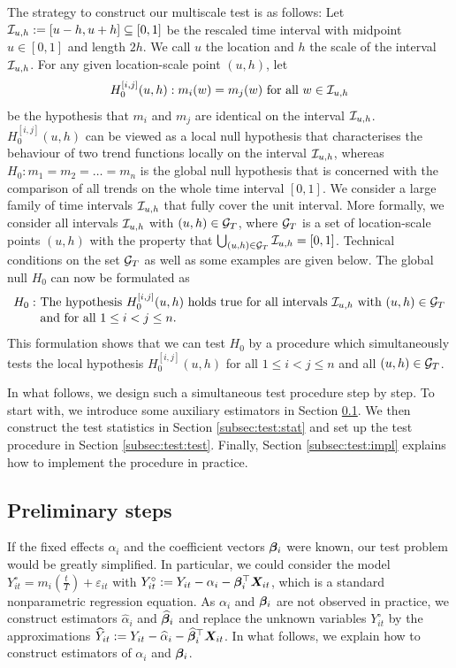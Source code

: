 \documentclass[12pt]{article}
\begin{document}
The strategy to construct our multiscale test is as follows: Let $\mathcal{I}_{u, h} := [u-h, u+h] \subseteq [0,1]$ be the rescaled time interval with midpoint $u \in [0,1]$ and length $2h$. We call $u$ the location
and $h$ the scale of the interval $\mathcal{I}_{u, h}$. For any given location-scale point $(u,h)$, let
\[ H_0^{[i, j]}(u, h): m_i(w) = m_j(w) \text{ for all } w \in \mathcal{I}_{u, h} \] 
be the hypothesis that $m_i$ and $m_j$ are identical on the interval $\mathcal{I}_{u, h}$. $H_0^{[i, j]}(u, h)$ can be viewed as a local null hypothesis that characterises the behaviour of two trend functions locally on the interval $\mathcal{I}_{u, h}$, whereas $H_0: m_1 = m_2 = \ldots = m_n$ is the global null hypothesis that is concerned with the comparison of all trends on the whole time interval $[0, 1]$. We consider a large family of time intervals $\mathcal{I}_{u, h}$ that fully cover the unit interval. More formally, we consider all intervals $\mathcal{I}_{u, h}$ with $(u,h) \in \mathcal{G}_T$, where $\mathcal{G}_T$ is a set of location-scale points $(u,h)$ with the property that $\bigcup_{(u, h) \in \mathcal{G}_T} \mathcal{I}_{u, h} = [0,1]$. Technical conditions on the set $\mathcal{G}_T$ as well as some examples are given below. The global null $H_0$ can now be formulated as 
\begin{align*}
H_0: \ & \text{The hypothesis } H_0^{[i, j]}(u, h) \text{ holds true for all intervals }  \mathcal{I}_{u, h} \text{ with } (u, h) \in \mathcal{G}_T \\[-0.075cm] & \text{and for all } 1 \le i < j \le n. 
\end{align*} 
This formulation shows that we can test $H_0$ by a procedure which simultaneously tests the local hypothesis $H_0^{[i, j]}(u, h)$ for all $1 \le i < j \le n$ and all $(u,h) \in \mathcal{G}_T$. 


In what follows, we design such a simultaneous test procedure step by step. To start with, we introduce some auxiliary estimators in Section \ref{subsec:test:prep}. We then construct the test statistics in Section \ref{subsec:test:stat} and set up the test procedure in Section \ref{subsec:test:test}. Finally, Section \ref{subsec:test:impl} explains how to implement the procedure in practice. 


\subsection{Preliminary steps}\label{subsec:test:prep}


If the fixed effects $\alpha_i$ and the coefficient vectors $\bm{\beta}_i$ were known, our test problem would be greatly simplified. In particular, we could consider the model
$Y_{it}^\circ = m_i (\frac{t}{T}) + \varepsilon_{it}$ with $Y_{it}^\circ := Y_{it} - \alpha_i - \bm{\beta}_i^\top \boldsymbol{X}_{it}$,
which is a standard nonparametric regression equation. As $\alpha_i$ and $\bm{\beta}_i$ are not observed in practice, we construct estimators $\widehat{\alpha}_i$ and $\widehat{\bm{\beta}}_i$ and replace the unknown variables $Y_{it}^\circ$ by the approximations $\widehat{Y}_{it} := Y_{it} -\widehat{\alpha}_i - \widehat{\bm{\beta}}_i^\top \boldsymbol{X}_{it}$. In what follows, we explain how to construct estimators of $\alpha_i$ and $\bm{\beta}_i$. 
\end{document}
